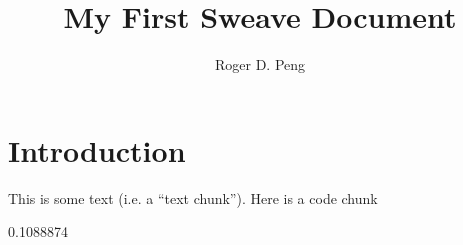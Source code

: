 \documentclass[11pt]{article}
\title{My First Sweave Document}
\author{Roger D. Peng}
\begin{document}
\maketitle
\section{Introduction}
This is some text (i.e. a ``text chunk'').   
Here is a code chunk
\begin{Schunk}
\begin{Soutput}
[1] 0.1088874
\end{Soutput}
\end{Schunk}
\end{document}
